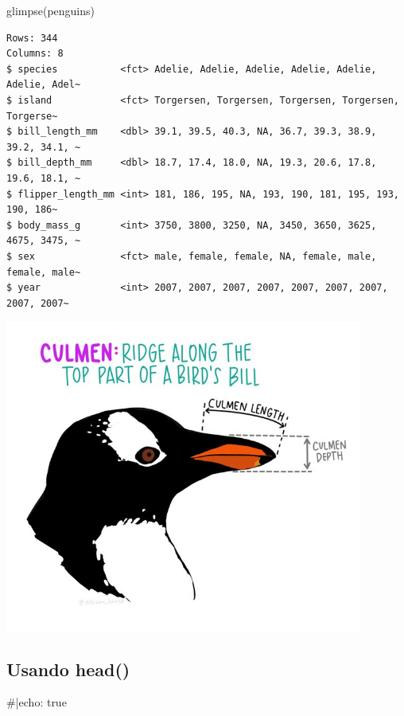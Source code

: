 \documentclass[
  12pt,
  letterpaper,
  DIV=11,
  numbers=noendperiod]{scrreprt}
\newenvironment{Shaded}{\begin{snugshade}}{\end{snugshade}}
\newcommand{\CommentTok}[1]{\textcolor[rgb]{0.37,0.37,0.37}{#1}}
\newcommand{\FunctionTok}[1]{\textcolor[rgb]{0.28,0.35,0.67}{#1}}
\newcommand{\NormalTok}[1]{\textcolor[rgb]{0.00,0.23,0.31}{#1}}
\theoremstyle{definition}
\theoremstyle{exemplo}
\begin{document}
\begin{Shaded}
\begin{Highlighting}[]
\FunctionTok{glimpse}\NormalTok{(penguins)}
\end{Highlighting}
\end{Shaded}

\begin{verbatim}
Rows: 344
Columns: 8
$ species           <fct> Adelie, Adelie, Adelie, Adelie, Adelie, Adelie, Adel~
$ island            <fct> Torgersen, Torgersen, Torgersen, Torgersen, Torgerse~
$ bill_length_mm    <dbl> 39.1, 39.5, 40.3, NA, 36.7, 39.3, 38.9, 39.2, 34.1, ~
$ bill_depth_mm     <dbl> 18.7, 17.4, 18.0, NA, 19.3, 20.6, 17.8, 19.6, 18.1, ~
$ flipper_length_mm <int> 181, 186, 195, NA, 193, 190, 181, 195, 193, 190, 186~
$ body_mass_g       <int> 3750, 3800, 3250, NA, 3450, 3650, 3625, 4675, 3475, ~
$ sex               <fct> male, female, female, NA, female, male, female, male~
$ year              <int> 2007, 2007, 2007, 2007, 2007, 2007, 2007, 2007, 2007~
\end{verbatim}

\begin{center}
\includegraphics[width=4.63542in,height=\textheight]{images/clipboard-1302732821.png}
\end{center}

\subsection{Usando head()}\label{usando-head}

\begin{Shaded}
\begin{Highlighting}[]
\CommentTok{\#|echo: true}
\end{Highlighting}
\end{Shaded}
\end{document}
